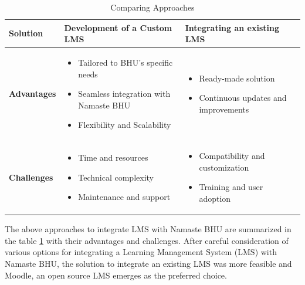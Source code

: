 \begin{table}[h]
    \centering
    \begin{tabular}{|p{}|p{}|p{}|}
        \hline
        \textbf{Solution} & Development of a Custom LMS & Integrating an existing LMS \\
        \hline
        \textbf{Advantages} &
        \begin{itemize}[noitemsep,topsep=0pt,leftmargin=*]
            \item Tailored to BHU's specific needs
            \item Seamless integration with Namaste BHU
            \item Flexibility and Scalability
        \end{itemize} &
        \begin{itemize}[noitemsep,topsep=0pt,leftmargin=*]
            \item Ready-made solution
            \item Continuous updates and improvements
        \end{itemize}\\
        \hline
        \textbf{Challenges} &
        \begin{itemize}[noitemsep,topsep=0pt,leftmargin=*]
            \item Time and resources
            \item Technical complexity
            \item Maintenance and support
        \end{itemize} &
        \begin{itemize}[noitemsep,topsep=0pt,leftmargin=*]
            \item Compatibility and customization
            \item Training and user adoption
        \end{itemize}\\
        \hline
    \end{tabular}
    \caption{Comparing Approaches}
    \label{tab:approaches}
\end{table}

The above approaches to integrate LMS with Namaste BHU are summarized in the table \ref{tab:approaches} with their advantages and challenges. After careful consideration of various options for integrating a Learning Management System (LMS) with Namaste BHU, the solution to integrate an existing LMS was more feasible and Moodle, an open source LMS emerges as the preferred choice.


